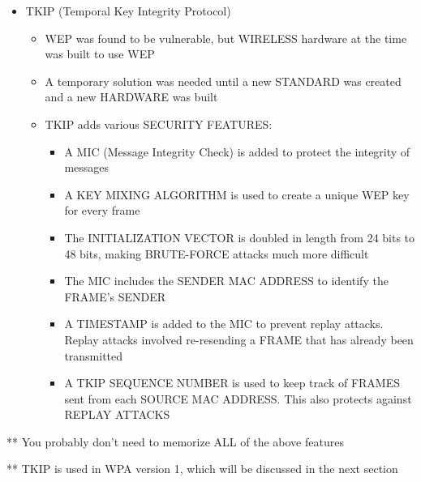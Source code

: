 \begin{itemize}
\tightlist
\item
  TKIP (Temporal Key Integrity Protocol)

  \begin{itemize}
  \tightlist
  \item
    WEP was found to be vulnerable, but WIRELESS hardware at the time
    was built to use WEP
  \item
    A temporary solution was needed until a new STANDARD was created and
    a new HARDWARE was built
  \item
    TKIP adds various SECURITY FEATURES:

    \begin{itemize}
    \tightlist
    \item
      A MIC (Message Integrity Check) is added to protect the integrity
      of messages
    \item
      A KEY MIXING ALGORITHM is used to create a unique WEP key for
      every frame
    \item
      The INITIALIZATION VECTOR is doubled in length from 24 bits to 48
      bits, making BRUTE-FORCE attacks much more difficult
    \item
      The MIC includes the SENDER MAC ADDRESS to identify the FRAME's
      SENDER
    \item
      A TIMESTAMP is added to the MIC to prevent replay attacks. Replay
      attacks involved re-resending a FRAME that has already been
      transmitted
    \item
      A TKIP SEQUENCE NUMBER is used to keep track of FRAMES sent from
      each SOURCE MAC ADDRESS. This also protects against REPLAY ATTACKS
    \end{itemize}
  \end{itemize}
\end{itemize}

** You probably don't need to memorize ALL of the above features

** TKIP is used in WPA version 1, which will be discussed in the next
section

